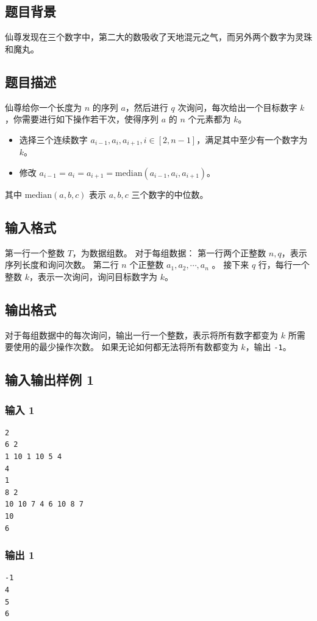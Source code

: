 \documentclass[12pt,a4paper,oneside]{ctexart}
\begin{document}
\subsection*{题目背景}
仙尊发现在三个数字中，第二大的数吸收了天地混元之气，而另外两个数字为灵珠和魔丸。
\subsection*{题目描述}
仙尊给你一个长度为 $n$ 的序列 $a$，然后进行 $q$ 次询问，每次给出一个目标数字 $k$，你需要进行如下操作若干次，使得序列 $a$ 的 $n$ 个元素都为 $k$。
\begin{itemize}
\item 选择三个连续数字 $a_{i-1},a_i,a_{i+1},i\in[2,n-1]$，满足其中至少有一个数字为 $k$。
\item 修改 $a_{i-1}=a_i=a_{i+1}=\text{median}(a_{i-1},a_i,a_{i+1})$。
\end{itemize}
其中 $\text{median}(a,b,c)$ 表示 $a,b,c$ 三个数字的中位数。
\subsection*{输入格式}
第一行一个整数 $T$，为数据组数。
对于每组数据：
第一行两个正整数 $n, q$，表示序列长度和询问次数。
第二行 $n$ 个正整数 $a_1, a_2, \cdots, a_n$ 。
接下来 $q$ 行，每行一个整数 $k$，表示一次询问，询问目标数字为 $k$。
\subsection*{输出格式}
对于每组数据中的每次询问，输出一行一个整数，表示将所有数字都变为 $k$ 所需要使用的最少操作次数。
如果无论如何都无法将所有数都变为 $k$，输出 \texttt{-1}。
\subsection*{输入输出样例 1}
\subsubsection*{输入 1}
\begin{verbatim}
2
6 2
1 10 1 10 5 4
4
1
8 2
10 10 7 4 6 10 8 7
10
6
\end{verbatim}
\subsubsection*{输出 1}
\begin{verbatim}
-1
4
5
6
\end{verbatim}
\end{document}
